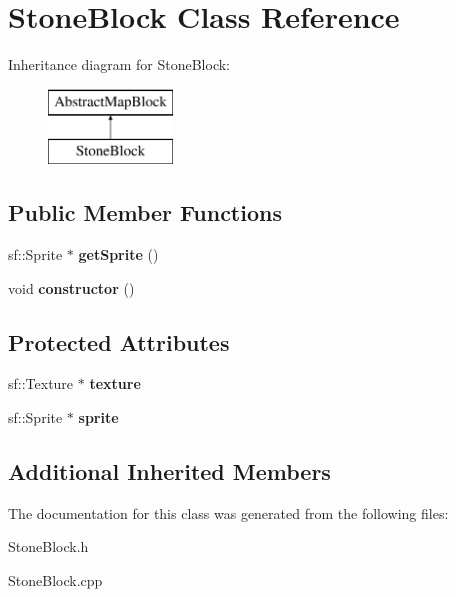 \hypertarget{class_stone_block}{}\section{Stone\+Block Class Reference}
\label{class_stone_block}
Inheritance diagram for Stone\+Block\+:\begin{figure}[H]
\begin{center}
\leavevmode
\includegraphics[height=2.000000cm]{class_stone_block}
\end{center}
\end{figure}
\subsection*{Public Member Functions}
\begin{DoxyCompactItemize}
\item 
\mbox{\label{class_stone_block_aa2e4adb1d50d9f326ffe427bcdd6d7bb}} 
sf\+::\+Sprite $\ast$ {\bfseries get\+Sprite} ()
\item 
\mbox{\label{class_stone_block_a391e99e613d1864c93647f60c9455a74}} 
void {\bfseries constructor} ()
\end{DoxyCompactItemize}
\subsection*{Protected Attributes}
\begin{DoxyCompactItemize}
\item 
\mbox{\label{class_stone_block_a86062896e0fedaad3bedbbd52641f76b}} 
sf\+::\+Texture $\ast$ {\bfseries texture}
\item 
\mbox{\label{class_stone_block_a1d66339d3e42126e72130dd6863d30b5}} 
sf\+::\+Sprite $\ast$ {\bfseries sprite}
\end{DoxyCompactItemize}
\subsection*{Additional Inherited Members}


The documentation for this class was generated from the following files\+:\begin{DoxyCompactItemize}
\item 
Stone\+Block.\+h\item 
Stone\+Block.\+cpp\end{DoxyCompactItemize}
